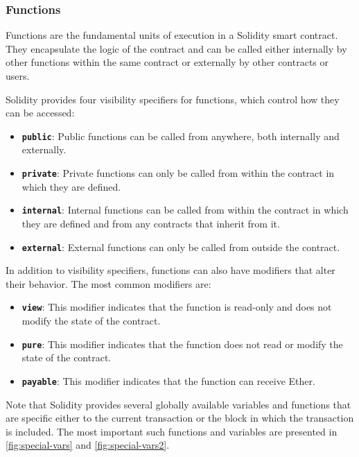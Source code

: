 \subsubsection{Functions}\label{functions}

Functions are the fundamental units of execution in a Solidity smart
contract. They encapsulate the logic of the contract and can be called
either internally by other functions within the same contract or
externally by other contracts or users.

Solidity provides four visibility specifiers for functions, which
control how they can be accessed:

\begin{itemize}
	\tightlist
	\item
	\textbf{\texttt{public}}: Public functions can be called from
	anywhere, both internally and externally.
	\item
	\textbf{\texttt{private}}: Private functions can only be called from
	within the contract in which they are defined.
	\item
	\textbf{\texttt{internal}}: Internal functions can be called from
	within the contract in which they are defined and from any contracts
	that inherit from it.
	\item
	\textbf{\texttt{external}}: External functions can only be called from
	outside the contract.
\end{itemize}

In addition to visibility specifiers, functions can also have modifiers
that alter their behavior. The most common modifiers are:

\begin{itemize}
	\tightlist
	\item
	\textbf{\texttt{view}}: This modifier indicates that the function is
	read-only and does not modify the state of the contract.
	\item
	\textbf{\texttt{pure}}: This modifier indicates that the function does
	not read or modify the state of the contract.
	\item
	\textbf{\texttt{payable}}: This modifier indicates that the function
	can receive Ether.
\end{itemize}

Note that Solidity provides several globally available variables and functions that are specific either to the current transaction or the block in which the transaction is included. 
The most important such functions and variables are presented in \autoref{fig:special-vars} and \autoref{fig:special-vars2}.

